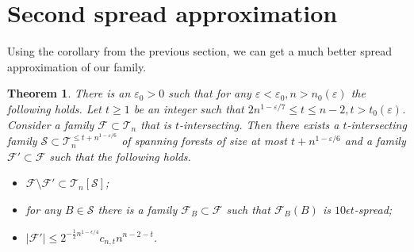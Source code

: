 \documentclass[11pt,letterpaper]{amsart}
\newcommand{\eps}{\varepsilon}
\renewcommand{\le}{\leqslant}
\renewcommand{\ge}{\geqslant}
\newcommand{\ff}{\mathcal{F}}
\newcommand{\s}{\mathcal{S}}
\newcommand{\T}{\mathcal{T}}
\newtheorem{theorem}{Theorem}
\begin{document}
\section{Second spread approximation}

Using the corollary from the previous section, we can get a much better spread approximation of our family.

\begin{theorem}\label{2SA}
There is an $\eps_0 > 0$ such that for any $\eps < \eps_0, n > n_0(\eps)$ the following holds. Let $t\ge1$ be an integer such that $2n^{1-\eps/7} \le t \le n- 2, t > t_0(\eps)$. Consider a family $\ff\subset \T_n$ that is $t$-intersecting. Then there exists a  $t$-intersecting family $\mathcal S\subset \T_n^{\le t + n^{1 - \eps/6}}$ of spanning forests of size at most $t + n^{1 - \eps/6}$ and a family $\ff'\subset \ff$ such that the following holds.

  \begin{itemize}
    \item[(i)] $\ff\setminus \ff'\subset \T_n[\s]$;
    \item[(ii)] for any $B\in \s$ there is a family $\ff_B\subset \ff$ such that $\ff_B(B)$ is $10\epsilon t$-spread;
    \item[(iii)] $|\ff'|\le 2^{-\frac 12 n^{1-\epsilon/4}}c_{n, t}n^{n-2-t}$.
  \end{itemize}
\end{theorem}
\end{document}
